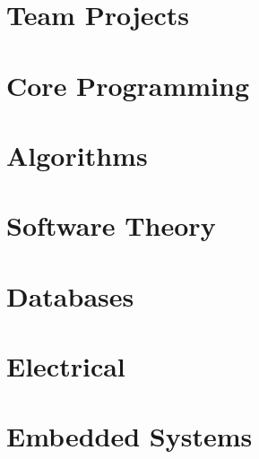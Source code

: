 \section{Team Projects}
\hypertarget{cat:team}{}
\newpage











\section{Core Programming}
\hypertarget{cat:programming}{}




\section{Algorithms}
\hypertarget{cat:algo}{}



\section{Software Theory}
\hypertarget{cat:theory}{}



\section{Databases}
\hypertarget{cat:database}{}





\section{Electrical}
\hypertarget{cat:elec}{}


\section{Embedded Systems}
\hypertarget{cat:embedded}{}






